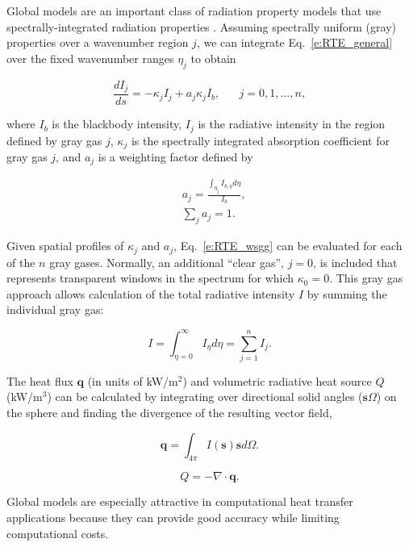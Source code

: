 \documentclass[preprint,12pt]{elsarticle}
\newcounter{bla}
\begin{document}
Global models are an important class of radiation property models that use spectrally-integrated radiation properties \cite{Hottel_1967,Modest_2013,Modest_2016}. Assuming spectrally uniform (gray) properties over a wavenumber region $j$, we can integrate Eq.~\ref{e:RTE_general} over the fixed wavenumber ranges $\eta_j$ to obtain 
%
\begin{linenomath}
\begin{equation} \label{e:RTE_wsgg}
	\frac{dI_j}{ds} = -\kappa_jI_j + a_j\kappa_jI_b, \hspace{20pt} j=0,1,...,n,
\end{equation}
\end{linenomath}
%
where $I_b$ is the blackbody intensity, $I_j$ is the radiative intensity in the region defined by gray gas $j$, $\kappa_j$ is the spectrally integrated absorption coefficient for gray gas $j$, and $a_j$ is a weighting factor defined by
%
\begin{linenomath}
\begin{align}
    &a_j= \frac{\int_{\eta_j}I_{b,\eta}d\eta}{I_b},\\
    &\sum_j a_j = 1.
\end{align}
\end{linenomath}
%
Given spatial profiles of $\kappa_j$ and $a_j$, Eq.~\ref{e:RTE_wsgg} can be evaluated for each of the $n$ gray gases. Normally, an additional ``clear gas'', $j=0$, is included that represents transparent windows in the spectrum for which $\kappa_0=0$. This gray gas approach allows calculation of the total radiative intensity $I$ by summing the individual gray gas: 
%
\begin{linenomath}
\begin{equation}
	I=\int_{\eta=0}^{\infty}I_{\eta}d\eta=\sum_{j=1}^n I_j.
\end{equation}
\end{linenomath}
%

The heat flux $\mathbf{q}$ (in units of kW/m$^2$) and volumetric radiative heat source $Q$ (kW/m$^3$) can be calculated by integrating over directional solid angles ($\mathbf{s}\Omega$) on the sphere and finding the divergence of the resulting vector field,
%
\begin{linenomath}
\begin{equation}
    \mathbf{q} = \int_{4\pi}I(\mathbf{s})\mathbf{s}d\Omega.
\end{equation}
\end{linenomath}
%
\begin{linenomath}
\begin{equation}
    Q = -\nabla\cdot\mathbf{q}.
\end{equation}
\end{linenomath}
%
Global models are especially attractive in computational heat transfer applications because they can provide good accuracy while limiting computational costs. 
\end{document}
